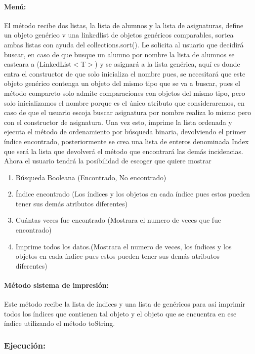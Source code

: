 \documentclass{report}
\begin{document}
\paragraph{Menú:}
El método recibe dos listas, la lista de alumnos y la lista de asignaturas, define un objeto genérico v una linkedlist de objetos genéricos comparables, sortea ambas listas con ayuda del collections.sort().
Le solicita al usuario que decidirá buscar, en caso de que busque un alumno por nombre la lista de alumnos se casteara a (LinkedList\(<\)T\(>\)) y se asignará a la lista genérica, aquí es donde entra el constructor de que solo inicializa el nombre pues, se necesitará que este objeto genérico contenga un objeto del mismo tipo que se va a buscar, pues el método compareto solo admite comparaciones con objetos del mismo tipo, pero solo inicializamos el nombre porque es el único atributo que consideraremos, en caso de que el usuario escoja buscar asignatura por nombre realiza lo mismo pero con el constructor de asignatura.
Una vez esto, imprime la lista ordenada y ejecuta el método de ordenamiento por búsqueda binaria, devolviendo el primer índice encontrado, posteriormente se crea una lista de enteros denominada Index que será la lista que devolverá el método que encontrará las demás incidencias.
Ahora el usuario tendrá la posibilidad de escoger que quiere mostrar
\begin{enumerate}
    \item Búsqueda Booleana (Encontrado, No encontrado)
    \item Índice encontrado (Los índices y los objetos en cada índice pues estos pueden tener sus demás atributos diferentes)
    \item Cuántas veces fue encontrado (Mostrara el numero de veces que fue encontrado)
    \item Imprime todos los datos.(Mostrara el numero de veces, los índices y los objetos en cada índice pues estos pueden tener sus demás atributos diferentes)
\end{enumerate}
\paragraph{Método sistema de impresión:}
Este método recibe la lista de índices y una lista de genéricos para así imprimir todos los índices que contienen tal objeto y el objeto que se encuentra en ese índice utilizando el método toString.
\subsubsection{Ejecución:}
\end{document}
